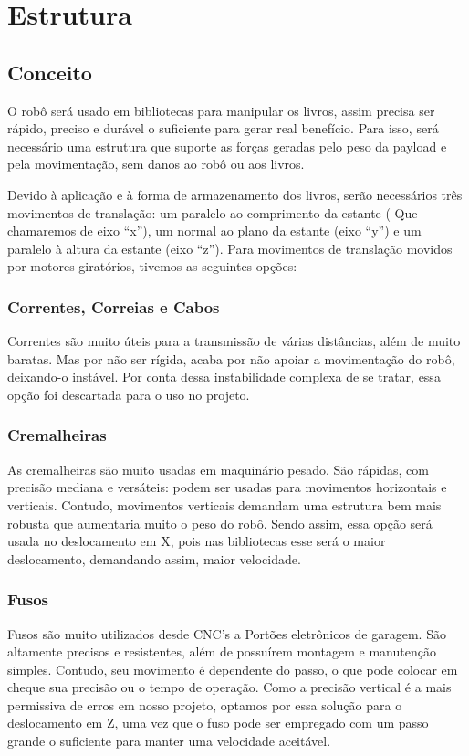 

\chapter[Estrutura] {Estrutura}
\section{Conceito}

O robô será usado em bibliotecas para manipular os livros, assim precisa ser rápido, preciso e durável o suficiente para gerar real benefício. Para isso, será necessário uma estrutura que suporte as forças geradas pelo peso da payload e pela movimentação, sem danos ao robô ou aos livros.

Devido à aplicação e à forma de armazenamento dos livros, serão necessários três movimentos de translação: um paralelo ao comprimento da estante ( Que chamaremos de eixo “x”), um normal ao plano da estante (eixo “y”) e um paralelo à altura da estante (eixo “z”). Para movimentos de translação movidos por motores giratórios, tivemos as seguintes opções:
\subsection{Correntes, Correias e Cabos}

Correntes são muito úteis para a transmissão de várias distâncias, além de muito baratas. Mas por não ser rígida, acaba por não apoiar a movimentação do robô, deixando-o instável. Por conta dessa instabilidade complexa de se tratar, essa opção foi descartada para o uso no projeto.  

\subsection{Cremalheiras}

As cremalheiras são muito usadas em maquinário pesado. São rápidas, com precisão mediana e versáteis: podem ser usadas para movimentos horizontais e verticais. Contudo, movimentos verticais demandam uma estrutura bem mais robusta que aumentaria muito o peso do robô. Sendo assim, essa opção será usada no deslocamento em X, pois nas bibliotecas esse será o maior deslocamento, demandando assim, maior velocidade.
\subsection{Fusos}

Fusos são muito utilizados desde CNC’s a Portões eletrônicos de garagem. São altamente precisos e resistentes, além de possuírem montagem e manutenção simples. Contudo, seu movimento é dependente do passo, o que pode colocar em cheque sua precisão ou o tempo de operação. Como a precisão vertical é a mais permissiva de erros em nosso projeto, optamos por essa solução para o deslocamento em Z, uma vez que o fuso pode ser empregado com um passo grande o suficiente para manter uma velocidade aceitável.

